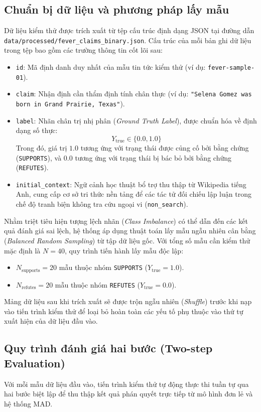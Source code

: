 \documentclass[12pt,a4paper]{report}
\begin{document}
\subsection{Chuẩn bị dữ liệu và phương pháp lấy mẫu}
Dữ liệu kiểm thử được trích xuất từ tệp cấu trúc định dạng JSON tại đường dẫn \texttt{data/processed/fever\_claims\_binary.json}. Cấu trúc của mỗi bản ghi dữ liệu trong tệp bao gồm các trường thông tin cốt lõi sau:
\begin{itemize}
    \item \texttt{id}: Mã định danh duy nhất của mẫu tin tức kiểm thử (ví dụ: \texttt{fever-sample-01}).
    \item \texttt{claim}: Nhận định cần thẩm định tính chân thực (ví dụ: \texttt{"Selena Gomez was born in Grand Prairie, Texas"}).
    \item \texttt{label}: Nhãn chân trị nhị phân (\textit{Ground Truth Label}), được chuẩn hóa về định dạng số thực:
    \begin{equation}
        Y_{\text{true}} \in \{0.0, 1.0\}
    \end{equation}
    Trong đó, giá trị $1.0$ tương ứng với trạng thái được củng cố bởi bằng chứng (\texttt{SUPPORTS}), và $0.0$ tương ứng với trạng thái bị bác bỏ bởi bằng chứng (\texttt{REFUTES}).
    \item \texttt{initial\_context}: Ngữ cảnh học thuật bổ trợ thu thập từ Wikipedia tiếng Anh, cung cấp cơ sở tri thức nền tảng để các tác tử đối chiếu lập luận trong chế độ tranh biện không tra cứu ngoại vi (\texttt{non\_search}).
\end{itemize}

Nhằm triệt tiêu hiện tượng lệch nhãn (\textit{Class Imbalance}) có thể dẫn đến các kết quả đánh giá sai lệch, hệ thống áp dụng thuật toán lấy mẫu ngẫu nhiên cân bằng (\textit{Balanced Random Sampling}) từ tập dữ liệu gốc. Với tổng số mẫu cần kiểm thử mặc định là $N = 40$, quy trình tiến hành lấy mẫu độc lập:
\begin{itemize}
    \item $N_{\text{supports}} = 20$ mẫu thuộc nhóm \texttt{SUPPORTS} ($Y_{\text{true}} = 1.0$).
    \item $N_{\text{refutes}} = 20$ mẫu thuộc nhóm \texttt{REFUTES} ($Y_{\text{true}} = 0.0$).
\end{itemize}
Mảng dữ liệu sau khi trích xuất sẽ được trộn ngẫu nhiên (\textit{Shuffle}) trước khi nạp vào tiến trình kiểm thử để loại bỏ hoàn toàn các yếu tố phụ thuộc vào thứ tự xuất hiện của dữ liệu đầu vào.

\subsection{Quy trình đánh giá hai bước (Two-step Evaluation)}
Với mỗi mẫu dữ liệu đầu vào, tiến trình kiểm thử tự động thực thi tuần tự qua hai bước biệt lập để thu thập kết quả phán quyết trực tiếp từ mô hình đơn lẻ và hệ thống MAD.
\end{document}
